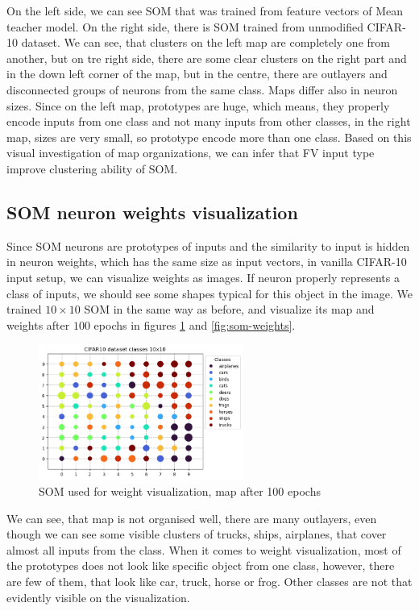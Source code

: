 On the left side, we can see SOM that was trained from feature vectors of Mean teacher model. On the right side, there is SOM trained from unmodified CIFAR-10 dataset. We can see, that clusters on the left map are completely one from another, but on tre right side, there are some clear clusters on the right part and in the down left corner of the map, but in the centre, there are outlayers and disconnected groups of neurons from the same class. Maps differ also in neuron sizes. Since on the left map, prototypes are huge, which means, they properly encode inputs from one class and not many inputs from other classes, in the right map, sizes are very small, so prototype encode more than one class. Based on this visual investigation of map organizations, we can infer that FV input type improve clustering ability of SOM.


\subsection{SOM neuron weights visualization}
Since SOM neurons are prototypes of inputs and the similarity to input is hidden in neuron weights, which has the same size as input vectors, in vanilla CIFAR-10 input setup, we can visualize weights as images. If neuron properly represents a class of inputs, we should see some shapes typical for this object in the image. We trained $10 \times 10$ SOM in the same way as before, and visualize its map and weights after $100$ epochs in figures \ref{fig:som-for-weights} and \ref{fig:som-weights}.

\begin{figure}[h!]
    \centering
    \includegraphics[width=0.6\textwidth]{figs/saved-cifar10-10n-99ep.png}
    \caption{SOM used for weight visualization, map after 100 epochs}
    \label{fig:som-for-weights}
\end{figure}

We can see, that map is not organised well, there are many outlayers, even though we can see some visible clusters of trucks, ships, airplanes, that cover almost all inputs from the class. When it comes to weight visualization, most of the prototypes does not look like specific object from one class, however, there are few of them, that look like car, truck, horse or frog. Other classes are not that evidently visible on the visualization.


